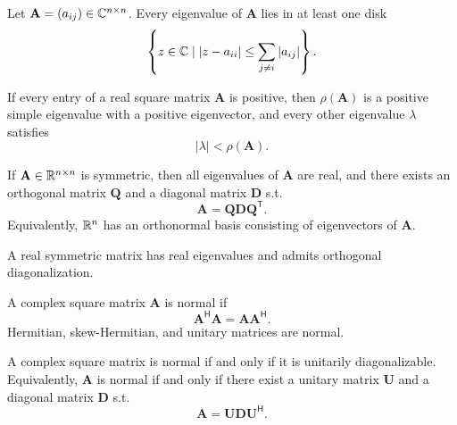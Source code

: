     \begin{theorem}
        Let $\mathbf{A}=(a_{ij})\in\mathbb{C}^{n\times n}$. Every eigenvalue of
        $\mathbf{A}$ lies in at least one disk
        \[
            \left\{z\in\mathbb{C}\mid
            |z-a_{ii}|\leq\sum_{j\neq i}|a_{ij}|
            \right\}.
        \]
    \end{theorem}

    \begin{theorem}
        If every entry of a real square matrix $\mathbf{A}$ is positive, then
        $\rho(\mathbf{A})$ is a positive simple eigenvalue with a positive
        eigenvector, and every other eigenvalue $\lambda$ satisfies
        \[
            |\lambda|<\rho(\mathbf{A}).
        \]
    \end{theorem}

    \begin{theorem}
        If $\mathbf{A}\in\mathbb{R}^{n\times n}$ is symmetric, then all eigenvalues of
        $\mathbf{A}$ are real, and there exists an orthogonal matrix
        $\mathbf{Q}$ and a diagonal matrix $\mathbf{D}$ s.t.
        \[
            \mathbf{A}
            =
            \mathbf{Q}\mathbf{D}\mathbf{Q}^{\mathsf T}.
        \]
        Equivalently, $\mathbb{R}^n$ has an orthonormal basis consisting of eigenvectors
        of $\mathbf{A}$.
    \end{theorem}

    \begin{remark}
        A real symmetric matrix has real eigenvalues and admits orthogonal
        diagonalization.
    \end{remark}

    \begin{definition}
        A complex square matrix $\mathbf{A}$ is normal if
        \[
            \mathbf{A}^{\mathsf H}\mathbf{A}
            =
            \mathbf{A}\mathbf{A}^{\mathsf H}.
        \]
        Hermitian, skew-Hermitian, and unitary matrices are normal.
    \end{definition}

    \begin{theorem}
        A complex square matrix is normal if and only if it is unitarily
        diagonalizable. Equivalently, $\mathbf{A}$ is normal if and only if
        there exist a unitary matrix $\mathbf{U}$ and a diagonal matrix
        $\mathbf{D}$ s.t.
        \[
            \mathbf{A}
            =
            \mathbf{U}\mathbf{D}\mathbf{U}^{\mathsf H}.
        \]
    \end{theorem}

